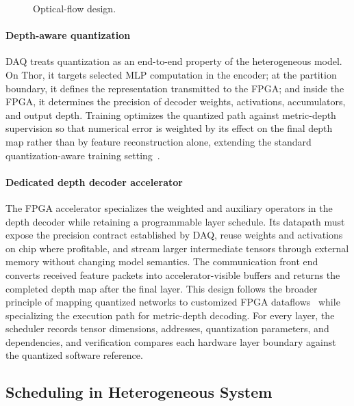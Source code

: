 \begin{figure}[b]
  \centering
  \caption{Optical-flow design. \pending}
  \label{fig:optical-flow}
\end{figure}

\paragraph{Depth-aware quantization}
DAQ treats quantization as an end-to-end property of the heterogeneous model.
On Thor, it targets selected MLP computation in the encoder; at the partition
boundary, it defines the representation transmitted to the FPGA; and inside
the FPGA, it determines the precision of decoder weights, activations,
accumulators, and output depth.  Training optimizes the quantized path against
metric-depth supervision so that numerical error is weighted by its effect on
the final depth map rather than by feature reconstruction alone, extending the
standard quantization-aware training setting~\cite{jacob2018quantization}.

\paragraph{Dedicated depth decoder accelerator}
The FPGA accelerator specializes the weighted and auxiliary operators in the
depth decoder while retaining a programmable layer schedule.  Its datapath
must expose the precision contract established by DAQ, reuse weights and
activations on chip where profitable, and stream larger intermediate tensors
through external memory without changing model semantics.  The communication
front end converts received feature packets into accelerator-visible buffers
and returns the completed depth map after the final layer.  This design follows
the broader principle of mapping quantized networks to customized FPGA
dataflows~\cite{umuroglu2017finn} while specializing the execution path for
metric-depth decoding.  For every layer, the scheduler records tensor
dimensions, addresses, quantization parameters, and dependencies, and
verification compares each hardware layer boundary against the quantized
software reference.

\subsection{Scheduling in Heterogeneous System}
\label{sec:scheduling}

